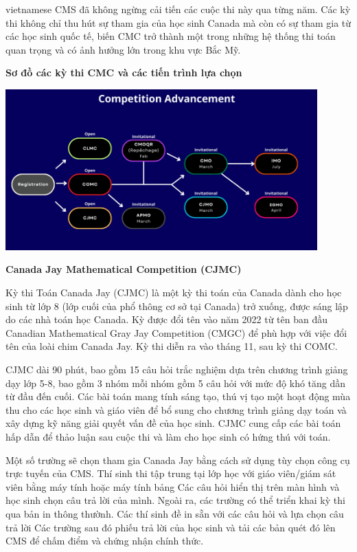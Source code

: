 \documentclass{article}
\begin{document}
\begin{otherlanguage*}{vietnamese}
\bigbreak
CMS đã không ngừng cải tiến các cuộc thi này qua từng năm. Các kỳ thi không chỉ thu hút sự tham gia của học sinh Canada mà còn có sự tham gia từ các học sinh quốc tế,
biến CMC trở thành một trong những hệ thống thi toán quan trọng và có ảnh hưởng lớn trong khu vực Bắc Mỹ.

\newpage

\textbf{Sơ đồ các kỳ thi CMC và các tiến trình lựa chọn}
\begin{center}
    \includegraphics[width=12cm]{./png/Competition-Advancement-EN-V6-Some-Dates-Cropped.png}
\end{center}

\bigbreak
\textbf{Canada Jay Mathematical Competition (CJMC)}

Kỳ thi Toán Canada Jay (CJMC) là một kỳ thi toán của Canada dành cho học sinh từ lớp 8 (lớp cuối của phổ thông cơ sở tại Canada) trở xuống, được sáng lập do các nhà toán học Canada.
Kỳ được đổi tên vào năm 2022 từ tên ban đầu Canadian Mathematical Gray Jay Competition (CMGC) để phù hợp với việc đổi tên của loài chim Canada Jay.
Kỳ thi diễn ra vào tháng 11, sau kỳ thi COMC.

CJMC dài 90 phút, bao gồm 15 câu hỏi trắc nghiệm dựa trên chương trình giảng dạy lớp 5-8, bao gồm 3 nhóm mỗi nhóm gồm 5 câu hỏi với mức độ khó tăng dần từ đầu đến cuối.
Các bài toán mang tính sáng tạo, thú vị tạo một hoạt động mùa thu cho các học sinh và giáo viên để bổ sung cho chương trình giảng dạy toán và xây dựng kỹ năng giải quyết vấn đề của học sinh.
CJMC cung cấp các bài toán hấp dẫn để thảo luận sau cuộc thi và làm cho học sinh có hứng thú với toán.

Một số trường sẽ chọn tham gia Canada Jay bằng cách sử dụng tùy chọn công cụ trực tuyến của CMS.
Thí sinh thi tập trung tại lớp học với giáo viên/giám sát viên bằng máy tính hoặc máy tính bảng Các câu hỏi hiển thị trên màn hình và học sinh chọn câu trả lời của mình.
Ngoài ra, các trường có thể triển khai kỳ thi qua bản in thông thườnh. Các thí sinh đề in sẵn với các câu hỏi và lựa chọn câu trả lời
Các trường sau đó phiếu trả lời của học sinh và tải các bản quét đó lên CMS để chấm điểm và chứng nhận chính thức.


\end{otherlanguage*}
\end{document}
